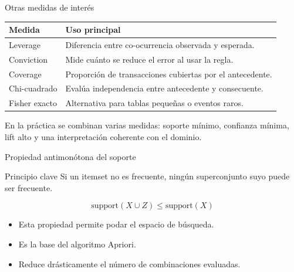 \documentclass[10pt,aspectratio=169]{beamer}
\begin{document}
\begin{frame}{Otras medidas de interés}
\begin{table}
\centering
\begin{tabular}{p{}p{}}
\toprule
Medida & Uso principal \\
\midrule
Leverage & Diferencia entre co-ocurrencia observada y esperada. \\
Conviction & Mide cuánto se reduce el error al usar la regla. \\
Coverage & Proporción de transacciones cubiertas por el antecedente. \\
Chi-cuadrado & Evalúa independencia entre antecedente y consecuente. \\
Fisher exacto & Alternativa para tablas pequeñas o eventos raros. \\
\bottomrule
\end{tabular}
\end{table}

\vspace{0.2cm}
En la práctica se combinan varias medidas: soporte mínimo, confianza mínima, lift alto y una interpretación coherente con el dominio.
\end{frame}

\begin{frame}{Propiedad antimonótona del soporte}
\begin{block}{Principio clave}
Si un itemset no es frecuente, ningún superconjunto suyo puede ser frecuente.
\end{block}

\[
\text{support}(X \cup Z) \leq \text{support}(X)
\]

\vspace{0.3cm}
\begin{itemize}
  \item Esta propiedad permite podar el espacio de búsqueda.
  \item Es la base del algoritmo Apriori.
  \item Reduce drásticamente el número de combinaciones evaluadas.
\end{itemize}
\end{frame}
\end{document}

